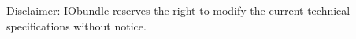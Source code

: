 \vspace*{0.5cm}
\noindent
\begin{scriptsize}
Disclaimer: IObundle reserves the right to modify the current
technical specifications without notice.
\end{scriptsize}
\newpage

